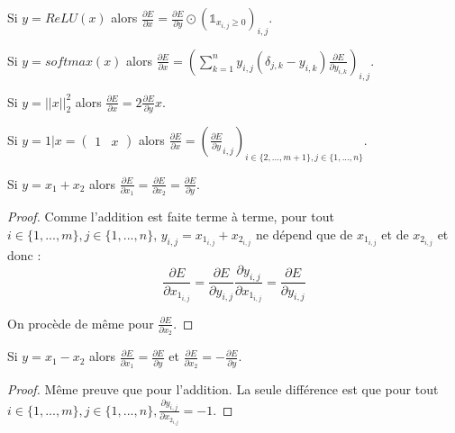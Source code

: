 \begin{proposition}
Si $y = ReLU(x)$ alors $\frac{\partial E}{\partial x} = \frac{\partial E}{\partial y} \odot (\mathds{1}_{x_{i,j} \geq 0})_{i,j}$.
\end{proposition}

\begin{proposition}
Si $y = softmax(x)$ alors $\frac{\partial E}{\partial x} = \left(\sum_{k = 1}^{n}{y_{i,j}(\delta_{j,k} - y_{i,k})\frac{\partial E}{\partial y_{i, k}}}\right)_{i,j}$.
\end{proposition}

\begin{proposition}
Si $y = ||x||_2^2$ alors $\frac{\partial E}{\partial x} = 2\frac{\partial E}{\partial y}x$.
\end{proposition}

\begin{proposition}
Si $y = 1|x = \begin{pmatrix}1 & x\end{pmatrix}$ alors $\frac{\partial E}{\partial x} = (\frac{\partial E}{\partial y}_{i, j})_{i \in \{2, ..., m+1\}, j \in \{1, ..., n\}}$.
\end{proposition}

\begin{proposition}
Si $y = x_1 + x_2$ alors $\frac{\partial E}{\partial x_1} = \frac{\partial E}{\partial x_2} = \frac{\partial E}{\partial y}$.
\end{proposition}

\begin{proof}
Comme l'addition est faite terme à terme, pour tout $i \in \{1, ..., m\}, j \in \{1, ..., n\}$, $y_{i, j} = x_{1_{i, j}} + x_{2_{i, j}}$ ne dépend que de $x_{1_{i, j}}$ et de $x_{2_{i, j}}$ et donc :
$$
\frac{\partial E}{\partial x_{1_{i, j}}} = \frac{\partial E}{\partial y_{i, j}}\frac{\partial y_{i, j}}{\partial x_{1_{i, j}}} = \frac{\partial E}{\partial y_{i, j}}
$$ 

On procède de même pour $\frac{\partial E}{\partial x_2}$.
\end{proof}

\begin{proposition}
Si $y = x_1 - x_2$ alors $\frac{\partial E}{\partial x_1} = \frac{\partial E}{\partial y}$ et $\frac{\partial E}{\partial x_2} = -\frac{\partial E}{\partial y}$.
\end{proposition}

\begin{proof}
Même preuve que pour l'addition. La seule différence est que pour tout $i \in \{1, ..., m\}, j \in \{1, ..., n\}, \frac{\partial y_{i, j}}{\partial x_{2_{i, j}}} = -1$.
\end{proof}


